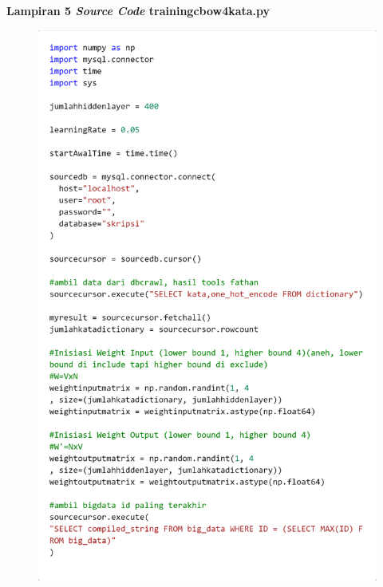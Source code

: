 \documentclass[12pt]{report}
\begin{document}
\newpage
{\parindent0pt \textbf{Lampiran 5 \textit{Source Code} trainingcbow4kata.py}}
\begin{figure}[H]
\centering
\includegraphics[scale=0.3]{trainingcbow4kata1}
\end{figure}
\end{document}
